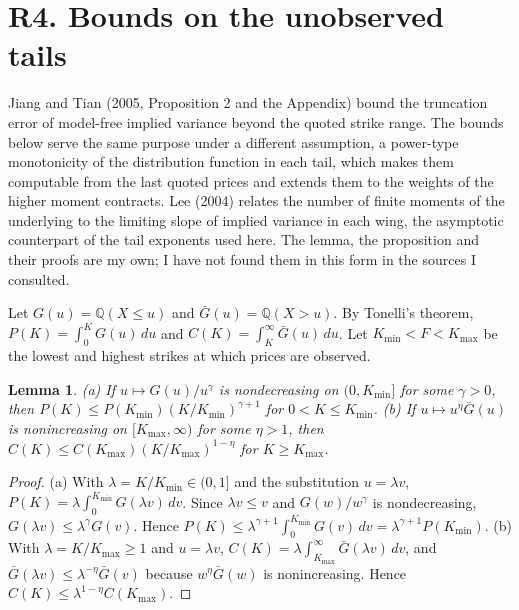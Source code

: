 \documentclass[11pt]{article}
\newtheorem{lemma}[proposition]{Lemma}
\theoremstyle{remark}
\newcommand{\Q}{\mathbb{Q}}
\begin{document}
\section*{R4. Bounds on the unobserved tails}

Jiang and Tian (2005, Proposition 2 and the Appendix) bound the truncation error of model-free implied variance beyond the quoted strike range. The bounds below serve the same purpose under a different assumption, a power-type monotonicity of the distribution function in each tail, which makes them computable from the last quoted prices and extends them to the weights of the higher moment contracts. Lee (2004) relates the number of finite moments of the underlying to the limiting slope of implied variance in each wing, the asymptotic counterpart of the tail exponents used here. The lemma, the proposition and their proofs are my own; I have not found them in this form in the sources I consulted.

Let $G(u)=\Q(X\le u)$ and $\bar G(u)=\Q(X>u)$. By Tonelli's theorem, $P(K)=\int_0^K G(u)\,du$ and $C(K)=\int_K^\infty\bar G(u)\,du$. Let $K_{\min}<F<K_{\max}$ be the lowest and highest strikes at which prices are observed.

\begin{lemma}
(a) If $u\mapsto G(u)/u^\gamma$ is nondecreasing on $(0,K_{\min}]$ for some $\gamma>0$, then $P(K)\le P(K_{\min})(K/K_{\min})^{\gamma+1}$ for $0<K\le K_{\min}$. (b) If $u\mapsto u^\eta\bar G(u)$ is nonincreasing on $[K_{\max},\infty)$ for some $\eta>1$, then $C(K)\le C(K_{\max})(K/K_{\max})^{1-\eta}$ for $K\ge K_{\max}$.
\end{lemma}

\begin{proof}
(a) With $\lambda=K/K_{\min}\in(0,1]$ and the substitution $u=\lambda v$, $P(K)=\lambda\int_0^{K_{\min}}G(\lambda v)\,dv$. Since $\lambda v\le v$ and $G(w)/w^\gamma$ is nondecreasing, $G(\lambda v)\le\lambda^\gamma G(v)$. Hence $P(K)\le\lambda^{\gamma+1}\int_0^{K_{\min}}G(v)\,dv=\lambda^{\gamma+1}P(K_{\min})$. (b) With $\lambda=K/K_{\max}\ge1$ and $u=\lambda v$, $C(K)=\lambda\int_{K_{\max}}^\infty\bar G(\lambda v)\,dv$, and $\bar G(\lambda v)\le\lambda^{-\eta}\bar G(v)$ because $w^\eta\bar G(w)$ is nonincreasing. Hence $C(K)\le\lambda^{1-\eta}C(K_{\max})$.
\end{proof}
\end{document}

